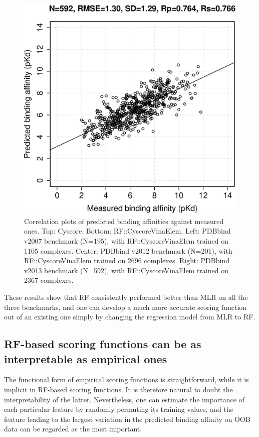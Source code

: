 \documentclass[journal=jacsat,manuscript=article]{achemso}
\begin{document}
\begin{figure}[ht!]
\endminipage
{}
\includegraphics[width=\linewidth]{../rfcyscore/x46/rf/trn-2367-tst-592-yp.eps}
\endminipage
\caption{Correlation plots of predicted binding affinities against measured ones. Top: Cyscore. Bottom: RF::CyscoreVinaElem. Left: PDBbind v2007 benchmark (N=195), with RF::CyscoreVinaElem trained on 1105 complexes. Center: PDBbind v2012 benchmark (N=201), with RF::CyscoreVinaElem trained on 2696 complexes. Right: PDBbind v2013 benchmark (N=592), with RF::CyscoreVinaElem trained on 2367 complexes.}
\label{fig:cor}
\end{figure}

These results show that RF consistently performed better than MLR on all the three benchmarks, and one can develop a much more accurate scoring function out of an existing one simply by changing the regression model from MLR to RF.

\subsection{RF-based scoring functions can be as interpretable as empirical ones} %

The functional form of empirical scoring functions is straightforward, while it is implicit in RF-based scoring functions. It is therefore natural to doubt the interpretability of the latter. Nevertheless, one can estimate the importance of each particular feature by randomly permuting its training values, and the feature leading to the largest variation in the predicted binding affinity on OOB data can be regarded as the most important.
\end{document}
